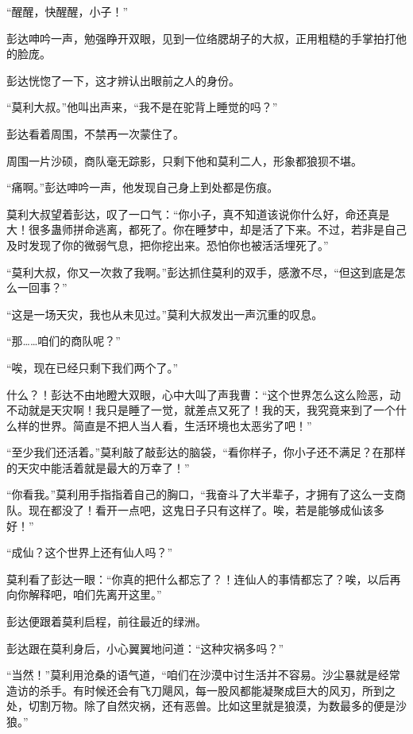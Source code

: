 
\begin{this_body}



“醒醒，快醒醒，小子！”

彭达呻吟一声，勉强睁开双眼，见到一位络腮胡子的大叔，正用粗糙的手掌拍打他的脸庞。

彭达恍惚了一下，这才辨认出眼前之人的身份。

“莫利大叔。”他叫出声来，“我不是在驼背上睡觉的吗？”

彭达看着周围，不禁再一次蒙住了。

周围一片沙硕，商队毫无踪影，只剩下他和莫利二人，形象都狼狈不堪。

“痛啊。”彭达呻吟一声，他发现自己身上到处都是伤痕。

莫利大叔望着彭达，叹了一口气：“你小子，真不知道该说你什么好，命还真是大！很多蛊师拼命逃离，都死了。你在睡梦中，却是活了下来。不过，若非是自己及时发现了你的微弱气息，把你挖出来。恐怕你也被活活埋死了。”

“莫利大叔，你又一次救了我啊。”彭达抓住莫利的双手，感激不尽，“但这到底是怎么一回事？”

“这是一场天灾，我也从未见过。”莫利大叔发出一声沉重的叹息。

“那……咱们的商队呢？”

“唉，现在已经只剩下我们两个了。”

什么？！彭达不由地瞪大双眼，心中大叫了声我曹：“这个世界怎么这么险恶，动不动就是天灾啊！我只是睡了一觉，就差点又死了！我的天，我究竟来到了一个什么样的世界。简直是不把人当人看，生活环境也太恶劣了吧！”

“至少我们还活着。”莫利敲了敲彭达的脑袋，“看你样子，你小子还不满足？在那样的天灾中能活着就是最大的万幸了！”

“你看我。”莫利用手指指着自己的胸口，“我奋斗了大半辈子，才拥有了这么一支商队。现在都没了！看开一点吧，这鬼日子只有这样了。唉，若是能够成仙该多好！”

“成仙？这个世界上还有仙人吗？”

莫利看了彭达一眼：“你真的把什么都忘了？！连仙人的事情都忘了？唉，以后再向你解释吧，咱们先离开这里。”

彭达便跟着莫利启程，前往最近的绿洲。

彭达跟在莫利身后，小心翼翼地问道：“这种灾祸多吗？”

“当然！”莫利用沧桑的语气道，“咱们在沙漠中讨生活并不容易。沙尘暴就是经常造访的杀手。有时候还会有飞刀飓风，每一股风都能凝聚成巨大的风刃，所到之处，切割万物。除了自然灾祸，还有恶兽。比如这里就是狼漠，为数最多的便是沙狼。”


\end{this_body}
